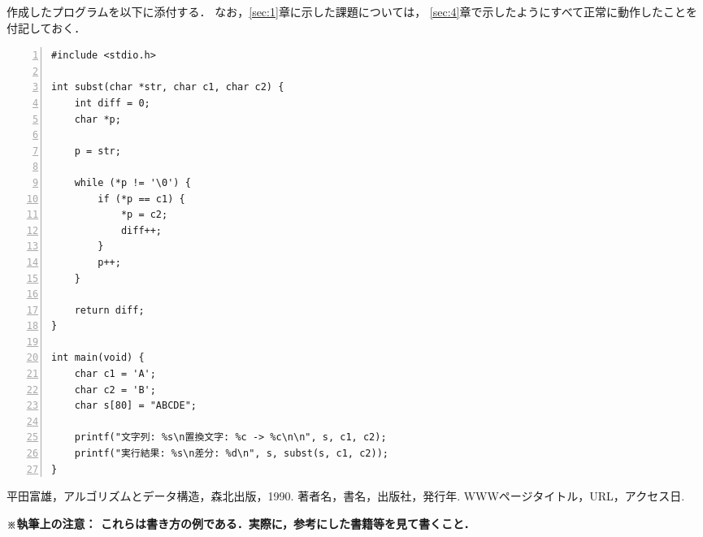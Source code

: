 作成したプログラムを以下に添付する．
なお，\ref{sec:1}章に示した課題については，
\ref{sec:4}章で示したようにすべて正常に動作したことを付記しておく．

\begin{Verbatim}[numbers=left, xleftmargin=10mm, numbersep=6pt,
                    fontsize=\small, baselinestretch=0.8]
#include <stdio.h>

int subst(char *str, char c1, char c2) {
    int diff = 0;
    char *p;

    p = str;

    while (*p != '\0') {
        if (*p == c1) {
            *p = c2;
            diff++;
        }
        p++;
    }

    return diff;
}

int main(void) {
    char c1 = 'A';
    char c2 = 'B';
    char s[80] = "ABCDE";

    printf("文字列: %s\n置換文字: %c -> %c\n\n", s, c1, c2);
    printf("実行結果: %s\n差分: %d\n", s, subst(s, c1, c2));
}
\end{Verbatim}


\begin{thebibliography}{99}
   平田富雄，アルゴリズムとデータ構造，森北出版，1990.
   著者名，書名，出版社，発行年.
   WWWページタイトル，URL，アクセス日.
\end{thebibliography}
\textbf{\small ※執筆上の注意：
      これらは書き方の例である．実際に，参考にした書籍等を見て書くこと．\\}


